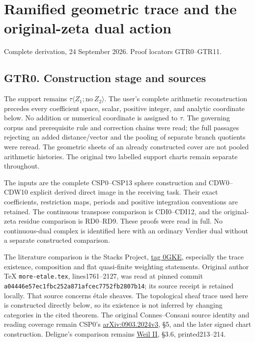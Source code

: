 \section{Ramified geometric trace and the original-zeta dual
action}\label{ramified-geometric-trace-and-the-original-zeta-dual-action}

Complete derivation, 24 September 2026. Proof locators GTR0--GTR11.

\subsection{GTR0. Construction stage and
sources}\label{gtr0.-construction-stage-and-sources}

The support remains \(\tau\langle Z_1;\mathrm{no}\ Z_2\rangle\). The
user's complete arithmetic reconstruction precedes every coefficient
space, scalar, positive integer, and analytic coordinate below. No
addition or numerical coordinate is assigned to \(\tau\). The governing
corpus and prerequisite rule and correction chains were read; the full
passages rejecting an added distance/vector and the pooling of separate
branch quotients were reread. The geometric sheets of an already
constructed cover are not pooled arithmetic histories. The original two
labelled support charts remain separate throughout.

The inputs are the complete CSP0--CSP13 sphere construction and
CDW0--CDW10 explicit derived direct image in the receiving task. Their
exact coefficients, restriction maps, periods and positive integration
conventions are retained. The continuous transpose comparison is
CDI0--CDI12, and the original-zeta residue comparison is RD0--RD9. These
proofs were read in full. No continuous-dual complex is identified here
with an ordinary Verdier dual without a separate constructed comparison.

The literature comparison is the Stacks Project,
\href{https://stacks.math.columbia.edu/tag/0GKE}{tag 0GKE}, especially
the trace existence, composition and flat quasi-finite weighting
statements. Original author TeX \texttt{more-etale.tex},
lines1761--2127, was read at pinned commit
\nolinkurl{a04446e57ec1fbc252a871afcec7752fb2807b14}; its source receipt
is retained locally. That source concerns étale sheaves. The topological
sheaf trace used here is constructed directly below, so its existence is
not inferred by changing categories in the cited theorem. The original
Connes--Consani source identity and reading coverage remain CSP0's
\href{https://arxiv.org/abs/0903.2024v3}{arXiv:0903.2024v3}, §5, and the
later signed chart construction. Deligne's comparison remains
\href{https://numdam.org/item/PMIHES_1980__52__137_0/}{Weil II}, §3.6,
printed213--214.

